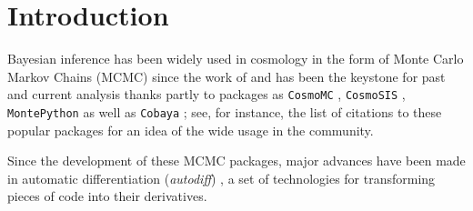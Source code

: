 \documentclass[twocolumn,twocolappendix,nofootinbib,iop]{openjournal}
\newcommand{\numpyro}{\texttt{NumPyro}}
\newcommand{\jaxcosmo}{\texttt{jax-cosmo}}
\begin{document}
\begin{abstract}

\end{abstract}

\maketitle




\section{Introduction}
Bayesian inference has been widely used in cosmology in the form of Monte Carlo Markov Chains (MCMC) since the work of \citep{2001ApJ...563L..95K,2003MNRAS.341.1084R} and has been the keystone for past and current analysis thanks partly to packages as  \texttt{CosmoMC} \citep{2002PhRvD..66j3511L}, \texttt{CosmoSIS} \citep{2015A&C....12...45Z}, \texttt{MontePython} \citep{2019PDU....24..260B} as well as   \texttt{Cobaya} \citep{2019ascl.soft10019T,2021JCAP...05..057T}; see, for instance, the list of citations to these popular packages for an idea of the wide usage in the community. 


Since the development of these MCMC packages, major advances have been made in automatic differentiation (\textit{autodiff}) \citep{10.5555/3122009.3242010, Margossian2019}, a set of technologies for transforming pieces of code into their derivatives.
\end{document}
